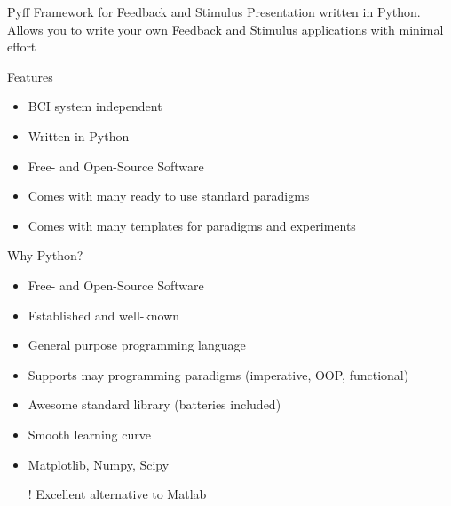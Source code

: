 \documentclass{beamer}
\begin{document}
\begin{frame}{Pyff}
    Framework for Feedback and Stimulus Presentation written in Python. Allows
    you to write your own Feedback and Stimulus applications with minimal
    effort
    \begin{block}{Features}
        \begin{itemize}
            \item BCI system independent
            \item Written in Python
            \item Free- and Open-Source Software
            \item Comes with many ready to use standard paradigms
            \item Comes with many templates for paradigms and experiments
        \end{itemize}
    \end{block}
\end{frame}

\begin{frame}{Why Python?}
    \begin{itemize}
        \item Free- and Open-Source Software
        \item Established and well-known
        \item General purpose programming language
        \item Supports may programming paradigms (imperative, OOP, functional)
        \item Awesome standard library (batteries included)
        \item Smooth learning curve
        \item Matplotlib, Numpy, Scipy
        \item[!] Excellent alternative to Matlab
    \end{itemize}
\end{frame}
\end{document}
